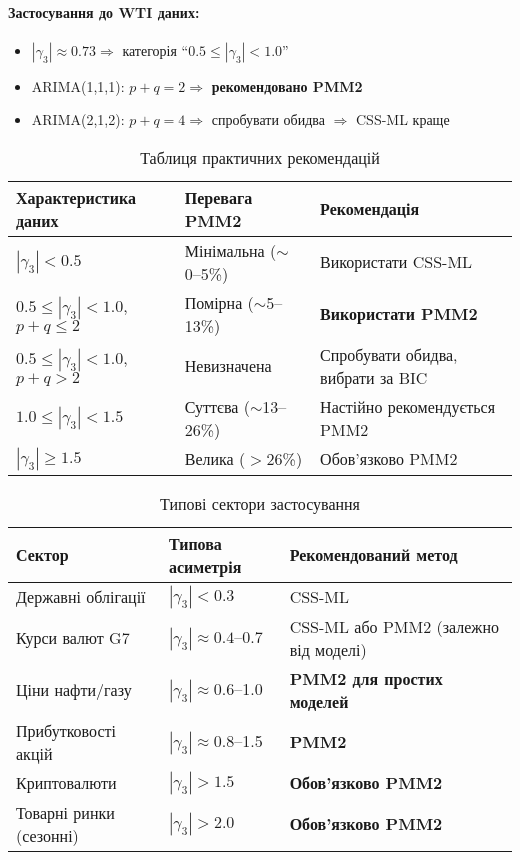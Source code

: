\documentclass[12pt,a4paper]{article}
\begin{document}
\paragraph{Застосування до WTI даних:}
\begin{itemize}
    \item $|\gamma_3| \approx 0.73 \Rightarrow$ категорія ``$0.5 \leq |\gamma_3| < 1.0$''
    \item ARIMA(1,1,1): $p+q = 2 \Rightarrow$ \textbf{рекомендовано PMM2} \checkmark
    \item ARIMA(2,1,2): $p+q = 4 \Rightarrow$ спробувати обидва $\Rightarrow$ CSS-ML краще \checkmark
\end{itemize}

\begin{table}[htbp]
\centering
\caption{Таблиця практичних рекомендацій}
\label{tab:wti_practical_recommendations}
\begin{tabular}{@{}lll@{}}
\toprule
\textbf{Характеристика даних} & \textbf{Перевага PMM2} & \textbf{Рекомендація} \\
\midrule
$|\gamma_3| < 0.5$ & Мінімальна ($\sim$0--5\%) & Використати CSS-ML \\
$0.5 \leq |\gamma_3| < 1.0$, $p+q \leq 2$ & Помірна ($\sim$5--13\%) & \textbf{Використати PMM2} \\
$0.5 \leq |\gamma_3| < 1.0$, $p+q > 2$ & Невизначена & Спробувати обидва, вибрати за BIC \\
$1.0 \leq |\gamma_3| < 1.5$ & Суттєва ($\sim$13--26\%) & Настійно рекомендується PMM2 \\
$|\gamma_3| \geq 1.5$ & Велика ($>$26\%) & Обов'язково PMM2 \\
\bottomrule
\end{tabular}
\end{table}

\begin{table}[htbp]
\centering
\caption{Типові сектори застосування}
\label{tab:wti_sector_recommendations}
\begin{tabular}{@{}lll@{}}
\toprule
\textbf{Сектор} & \textbf{Типова асиметрія} & \textbf{Рекомендований метод} \\
\midrule
Державні облігації & $|\gamma_3| < 0.3$ & CSS-ML \\
Курси валют G7 & $|\gamma_3| \approx 0.4$--0.7 & CSS-ML або PMM2 (залежно від моделі) \\
Ціни нафти/газу & $|\gamma_3| \approx 0.6$--1.0 & \textbf{PMM2 для простих моделей} \\
Прибутковості акцій & $|\gamma_3| \approx 0.8$--1.5 & \textbf{PMM2} \\
Криптовалюти & $|\gamma_3| > 1.5$ & \textbf{Обов'язково PMM2} \\
Товарні ринки (сезонні) & $|\gamma_3| > 2.0$ & \textbf{Обов'язково PMM2} \\
\bottomrule
\end{tabular}
\end{table}
\end{document}
